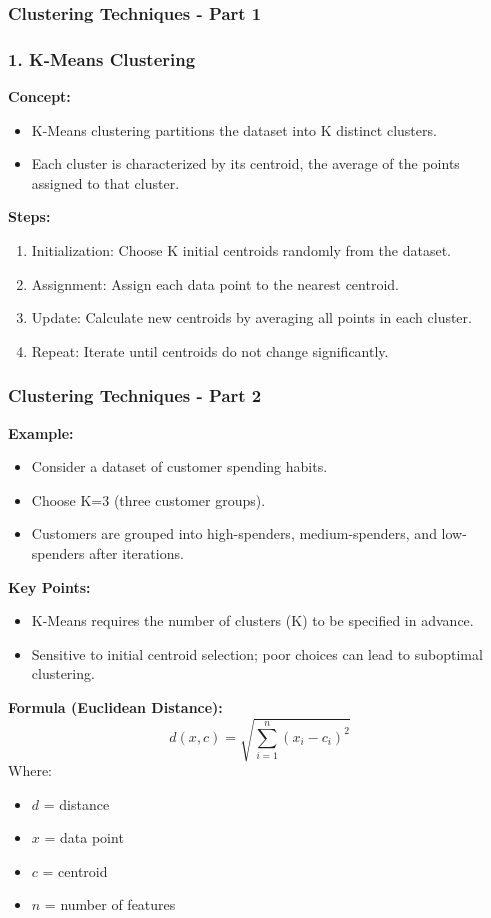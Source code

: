 \documentclass[aspectratio=169]{beamer}
\begin{document}
\begin{frame}[fragile]
    \frametitle{Clustering Techniques - Part 1}
    \frametitle{1. K-Means Clustering}
    
    \textbf{Concept:}
    \begin{itemize}
        \item K-Means clustering partitions the dataset into K distinct clusters.
        \item Each cluster is characterized by its centroid, the average of the points assigned to that cluster.
    \end{itemize}
    
    \textbf{Steps:}
    \begin{enumerate}
        \item Initialization: Choose K initial centroids randomly from the dataset.
        \item Assignment: Assign each data point to the nearest centroid.
        \item Update: Calculate new centroids by averaging all points in each cluster.
        \item Repeat: Iterate until centroids do not change significantly.
    \end{enumerate}
\end{frame}

\begin{frame}[fragile]
    \frametitle{Clustering Techniques - Part 2}
    \textbf{Example:}
    \begin{itemize}
        \item Consider a dataset of customer spending habits.
        \item Choose K=3 (three customer groups).
        \item Customers are grouped into high-spenders, medium-spenders, and low-spenders after iterations.
    \end{itemize}
    
    \textbf{Key Points:}
    \begin{itemize}
        \item K-Means requires the number of clusters (K) to be specified in advance.
        \item Sensitive to initial centroid selection; poor choices can lead to suboptimal clustering.
    \end{itemize}
    
    \textbf{Formula (Euclidean Distance):}
    \begin{equation}
        d(x, c) = \sqrt{\sum_{i=1}^{n}(x_i - c_i)^2}
    \end{equation}
    Where:
    \begin{itemize}
        \item \(d\) = distance
        \item \(x\) = data point
        \item \(c\) = centroid
        \item \(n\) = number of features
    \end{itemize}
\end{frame}
\end{document}

